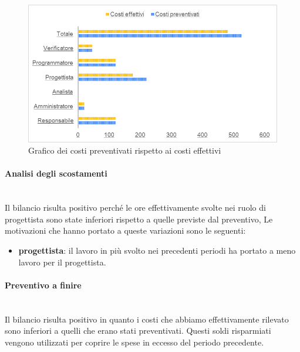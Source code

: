 \begin{figure} [H]
	\includegraphics[width=\linewidth]{./img/Grafici/42.png}
	\caption{Grafico dei costi preventivati rispetto ai costi effettivi}
\end{figure}

\paragraph*{Analisi degli scostamenti} \mbox{} \\
Il bilancio risulta positivo perché le ore effettivamente svolte nei ruolo di progettista sono state inferiori rispetto a quelle previste dal preventivo,
Le motivazioni che hanno portato a queste variazioni sono le seguenti:
\begin{itemize}
	\item \textbf{progettista}: il lavoro in più svolto nei precedenti periodi ha portato a meno lavoro per il progettista.
\end{itemize}
\paragraph*{Preventivo a finire} \mbox{} \\
Il bilancio risulta positivo in quanto i costi che abbiamo effettivamente rilevato sono inferiori a quelli che erano stati preventivati. Questi soldi risparmiati vengono utilizzati per coprire le spese in eccesso del periodo precedente.









































